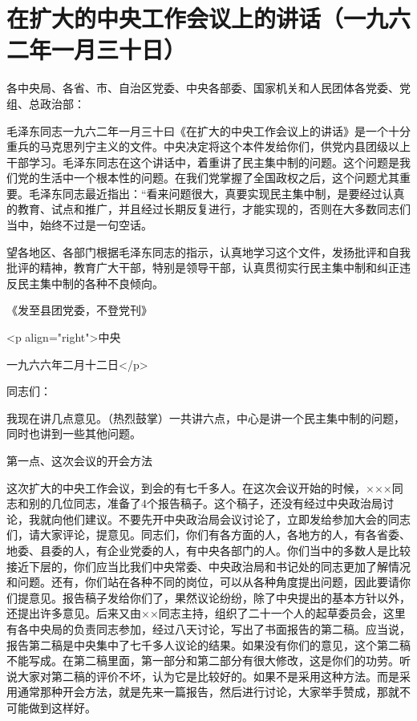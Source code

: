 \section{在扩大的中央工作会议上的讲话（一九六二年一月三十日）}


各中央局、各省、市、自治区党委、中央各部委、国家机关和人民团体各党委、党组、总政治部：

毛泽东同志一九六二年一月三十曰《在扩大的中央工作会议上的讲话》是一个十分重兵的马克思列宁主义的文件。中央决定将这个本件发给你们，供党内县团级以上干部学习。毛泽东同志在这个讲话中，着重讲了民主集中制的问题。这个问题是我们党的生活中一个根本性的问题。在我们党掌握了全国政权之后，这个问题尤其重要。毛泽东同志最近指出：“看来问题很大，真要实现民主集中制，是要经过认真的教育、试点和推广，并且经过长期反复进行，才能实现的，否则在大多数同志们当中，始终不过是一句空话。

望各地区、各部门根据毛泽东同志的指示，认真地学习这个文件，发扬批评和自我批评的精神，教育广大干部，特别是领导干部，认真贯彻实行民主集中制和纠正违反民主集中制的各种不良倾向。

《发至县团党委，不登党刊》

<p align="right">中央

一九六六年二月十二日</p>

同志们：

我现在讲几点意见。（热烈鼓掌）一共讲六点，中心是讲一个民主集中制的问题，同时也讲到一些其他问题。

第一点、这次会议的开会方法

这次扩大的中央工作会议，到会的有七千多人。在这次会议开始的时候，×××同志和别的几位同志，准备了4个报告稿子。这个稿子，还没有经过中央政治局讨论，我就向他们建议。不要先开中央政治局会议讨论了，立即发给参加大会的同志们，请大家评论，提意见。同志们，你们有各方面的人，各地方的人，有各省委、地委、县委的人，有企业党委的人，有中央各部门的人。你们当中的多数人是比较接近下层的，你们应当比我们中央常委、中央政治局和书记处的同志更加了解情况和问题。还有，你们站在各种不同的岗位，可以从各种角度提出问题，因此要请你们提意见。报告稿子发给你们了，果然议论纷纷，除了中央提出的基本方针以外，还提出许多意见。后来又由××同志主持，组织了二十一个人的起草委员会，这里有各中央局的负责同志参加，经过八天讨论，写出了书面报告的第二稿。应当说，报告第二稿是中央集中了七千多人议论的结果。如果没有你们的意见，这个第二稿不能写成。在第二稿里面，第一部分和第二部分有很大修改，这是你们的功劳。听说大家对第二稿的评价不坏，认为它是比较好的。如果不是采用这种方法。而是采用通常那种开会方法，就是先来一篇报告，然后进行讨论，大家举手赞成，那就不可能做到这样好。

